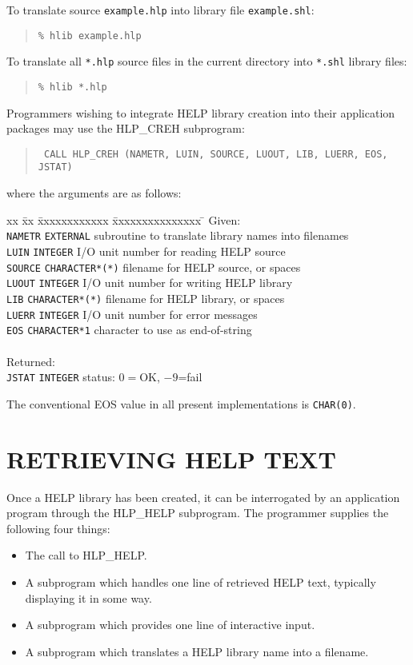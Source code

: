 To translate source \verb|example.hlp| into library file \verb|example.shl|:
\begin{verse}
\verb|% hlib example.hlp|
\end{verse}
To translate all \verb|*.hlp| source files in the current directory
into \verb|*.shl| library files:
\begin{verse}
\verb|% hlib *.hlp|
\end{verse}

Programmers wishing to integrate HELP library creation into their
application packages may use the HLP\_CREH subprogram:
\begin{verse}
\verb| CALL HLP_CREH (NAMETR, LUIN, SOURCE, LUOUT, LIB, LUERR, EOS, JSTAT)|
\end{verse}
where the arguments are as follows:
\begin{tabbing}
xx \= xx \= xxxxxxxxxxxx \= xxxxxxxxxxxxxxx \= \kill
\> Given: \\
\> \> \verb|NAMETR| \> \verb|EXTERNAL| \>
                 subroutine to translate library names into filenames \\
\> \> \verb|LUIN| \> \verb|INTEGER| \>
                              I/O unit number for reading HELP source \\
\> \> \verb|SOURCE| \> \verb|CHARACTER*(*)| \>
                                  filename for HELP source, or spaces \\
\> \> \verb|LUOUT| \> \verb|INTEGER| \>
                             I/O unit number for writing HELP library \\
\> \> \verb|LIB| \> \verb|CHARACTER*(*)| \>
                                 filename for HELP library, or spaces \\
\> \> \verb|LUERR| \> \verb|INTEGER| \>
                                   I/O unit number for error messages \\
\> \> \verb|EOS| \> \verb|CHARACTER*1| \>
                                    character to use as end-of-string \\ \\
\> Returned: \\
\> \> \verb|JSTAT| \> \verb|INTEGER| \>
                                            status: $0=$OK, $-9$=fail
\end{tabbing}
The conventional EOS value in all present implementations is \verb|CHAR(0)|.

\section{RETRIEVING HELP TEXT}
Once a HELP library has been created, it can be interrogated by an
application program through the HLP\_HELP subprogram.  The programmer
supplies the following four things:
\begin{itemize}
\item The call to HLP\_HELP.
\item A subprogram which handles one line of retrieved HELP text,
typically displaying it in some way.
\item A subprogram which provides one line of interactive input.
\item A subprogram which translates a HELP library name into a filename.
\end{itemize}

